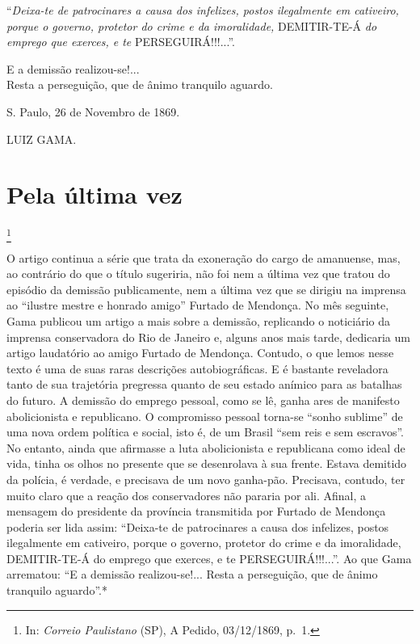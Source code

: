 ``\emph{Deixa-te de patrocinares a causa dos infelizes, postos
ilegalmente em cativeiro, porque o governo, protetor do crime e da
imoralidade,} DEMITIR-TE-Á \emph{do emprego que exerces, e te}
PERSEGUIRÁ!!!...''.

E a demissão realizou-se!...\\
Resta a perseguição, que de ânimo tranquilo aguardo.

S. Paulo, 26 de Novembro de 1869.

LUIZ GAMA.

\chapter{Pela última vez}\footnote{In: \emph{Correio Paulistano} (SP), A
  Pedido, 03/12/1869, p.~1.}

\begin{didascalia}
O artigo continua a série que trata da exoneração do cargo de amanuense,
mas, ao contrário do que o título sugeriria, não foi nem a última vez
que tratou do episódio da demissão publicamente, nem a última vez que se
dirigiu na imprensa ao ``ilustre mestre e honrado amigo'' Furtado de
Mendonça. No mês seguinte, Gama publicou um artigo a mais sobre a
demissão, replicando o noticiário da imprensa conservadora do Rio de
Janeiro e, alguns anos mais tarde, dedicaria um artigo laudatório ao
amigo Furtado de Mendonça. Contudo, o que lemos nesse texto é uma de
suas raras descrições autobiográficas. E é bastante reveladora tanto de
sua trajetória pregressa quanto de seu estado anímico para as batalhas
do futuro. A demissão do emprego pessoal, como se lê, ganha ares de
manifesto abolicionista e republicano. O compromisso pessoal torna-se
``sonho sublime'' de uma nova ordem política e social, isto é, de um
Brasil ``sem reis e sem escravos''. No entanto, ainda que afirmasse a luta
abolicionista e republicana como ideal de vida, tinha os olhos no
presente que se desenrolava à sua frente. Estava demitido da polícia, é
verdade, e precisava de um novo ganha-pão. Precisava, contudo, ter muito
claro que a reação dos conservadores não pararia por ali. Afinal, a
mensagem do presidente da província transmitida por Furtado de Mendonça
poderia ser lida assim: ``Deixa-te de patrocinares a causa dos infelizes,
postos ilegalmente em cativeiro, porque o governo, protetor do crime e
da imoralidade, DEMITIR-TE-Á do emprego que exerces, e te
PERSEGUIRÁ!!!...''. Ao que Gama arrematou: ``E a demissão realizou-se!...
Resta a perseguição, que de ânimo tranquilo aguardo''.*
\end{didascalia}

